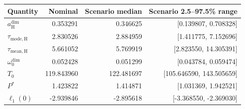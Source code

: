 \begin{tabular}{lrrr}
\toprule
Quantity & Nominal & Scenario median & Scenario 2.5--97.5\% range \\
\midrule
$a_{\mathrm H}^{\mathrm{dim}}$ & 0.353291 & 0.346625 & [0.139807, 0.708328] \\
$\tau_{\mathrm{mode,H}}$ & 2.830526 & 2.884959 & [1.411775, 7.152696] \\
$\tau_{\mathrm{mean,H}}$ & 5.661052 & 5.769919 & [2.823550, 14.305391] \\
$\omega_0^{\mathrm{dim}}$ & 0.052428 & 0.051299 & [0.043784, 0.059474] \\
$T_0$ & 119.843960 & 122.481697 & [105.646590, 143.505659] \\
$P^*$ & 1.423822 & 1.414871 & [1.031369, 1.942521] \\
$\ell_1(0)$ & -2.939846 & -2.895618 & [-3.368550, -2.369030] \\
\bottomrule
\end{tabular}